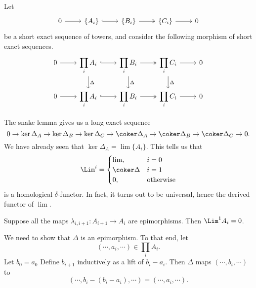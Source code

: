 \documentclass[main.tex]{subfiles}
\begin{document}
Let
\begin{equation*}
  \begin{tikzcd}
    0
    \arrow[r]
    & \{A_{i}\}
    \arrow[r, hook]
    & \{B_{i}\}
    \arrow[r, two heads]
    & \{C_{i}\}
    \arrow[r]
    & 0
  \end{tikzcd}
\end{equation*}
be a short exact sequence of towers, and consider the following morphism of short exact sequences.
\begin{equation*}
  \begin{tikzcd}
    0
    \arrow[r]
    & \displaystyle\prod\limits_{i} A_{i}
    \arrow[r, hook]
    \arrow[d, "\Delta"]
    & \displaystyle\prod\limits_{i} B_{i}
    \arrow[r, two heads]
    \arrow[d, "\Delta"]
    & \displaystyle\prod\limits_{i} C_{i}
    \arrow[r]
    \arrow[d, "\Delta"]
    & 0
    \\
    0
    \arrow[r]
    & \displaystyle\prod\limits_{i} A_{i}
    \arrow[r, hook]
    & \displaystyle\prod\limits_{i} B_{i}
    \arrow[r, two heads]
    & \displaystyle\prod\limits_{i} C_{i}
    \arrow[r]
    & 0
  \end{tikzcd}
\end{equation*}

The snake lemma gives us a long exact sequence
\begin{equation*}
  0 \to \ker \Delta_{A} \to \ker \Delta_{B} \to \ker \Delta_{C} \to \coker \Delta_{A} \to \coker \Delta_{B} \to \coker \Delta_{C} \to 0.
\end{equation*}
We have already seen that \(\ker \Delta_{A} = \lim \{A_{i}\}\). This tells us that
\begin{equation*}
  \Lim^{i} =
  \begin{cases}
    \lim, &i = 0 \\
    \coker \Delta & i = 1 \\
    0, &\text{otherwise}
  \end{cases}
\end{equation*}
is a homological \(\delta\)-functor. In fact, it turns out to be universal, hence the derived functor of \(\lim\).

\begin{lemma}
  \label{lemma:limit_of_tower_exact_when_all_maps_onto}
  Suppose all the maps \(\lambda_{i, i+1}\colon A_{i+1} \to A_{i}\) are epimorphisms. Then \(\Lim^{1} A_{i} = 0\).

  We need to show that \(\Delta\) is an epimorphism. To that end, let
  \begin{equation*}
    (\cdots, a_{i}, \cdots) \in \prod_{i} A_{i}.
  \end{equation*}
  Let \(b_{0} = a_{0}\) Define \(b_{i+1}\) inductively as a lift of \(b_{i} - a_{i}\). Then \(\Delta\) maps \((\cdots, b_{i}, \cdots)\) to
  \begin{equation*}
    (\cdots, b_{i} - (b_{i} - a_{i}), \cdots) = (\cdots, a_{i}, \cdots).
  \end{equation*}
\end{lemma}
\end{document}
